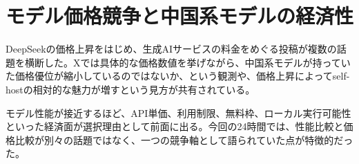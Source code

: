 \section{モデル価格競争と中国系モデルの経済性}

DeepSeekの価格上昇をはじめ、生成AIサービスの料金をめぐる投稿が複数の話題を横断した。Xでは具体的な価格数値を挙げながら、中国系モデルが持っていた価格優位が縮小しているのではないか、という観測や、価格上昇によってself-hostの相対的な魅力が増すという見方が共有されている。

モデル性能が接近するほど、API単価、利用制限、無料枠、ローカル実行可能性といった経済面が選択理由として前面に出る。今回の24時間では、性能比較と価格比較が別々の話題ではなく、一つの競争軸として語られていた点が特徴的だった。
